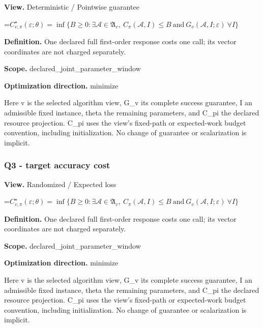 \documentclass[10pt,a4paper]{article}
\newcommand{\AtlasMath}[1]{\par\begingroup\centering\setbox0=\hbox{$\displaystyle #1$}\ifdim\wd0>1.4\linewidth\typeout{ATLAS WIDE FORMULA: \the\wd0}\fi\ifdim\wd0>\linewidth\resizebox{\linewidth}{!}{\box0}\else\box0\fi\par\endgroup}
\begin{document}
\textbf{View.} Deterministic / Pointwise guarantee



\AtlasMath{C^\star_{v,\pi}(\varepsilon;\theta)=\inf\{B\ge0:\exists\mathcal A\in\mathfrak A_v,\ C_\pi(\mathcal A,I)\le B\ \text{and}\ G_v(\mathcal A,I;\varepsilon)\ \forall I\}}


\textbf{Definition.} One declared full first-order response costs one call; its vector coordinates are not charged separately.



\textbf{Scope.} declared\_joint\_parameter\_window



\textbf{Optimization direction.} minimize



Here v is the selected algorithm view, G\_v its complete success guarantee, I an admissible fixed instance, theta the remaining parameters, and C\_pi the declared resource projection. C\_pi uses the view's fixed-path or expected-work budget convention, including initialization. No change of guarantee or scalarization is implicit.



\subsubsection{Q3 - target accuracy cost}


\textbf{View.} Randomized / Expected loss



\AtlasMath{C^\star_{v,\pi}(\varepsilon;\theta)=\inf\{B\ge0:\exists\mathcal A\in\mathfrak A_v,\ C_\pi(\mathcal A,I)\le B\ \text{and}\ G_v(\mathcal A,I;\varepsilon)\ \forall I\}}


\textbf{Definition.} One declared full first-order response costs one call; its vector coordinates are not charged separately.



\textbf{Scope.} declared\_joint\_parameter\_window



\textbf{Optimization direction.} minimize



Here v is the selected algorithm view, G\_v its complete success guarantee, I an admissible fixed instance, theta the remaining parameters, and C\_pi the declared resource projection. C\_pi uses the view's fixed-path or expected-work budget convention, including initialization. No change of guarantee or scalarization is implicit.
\end{document}
